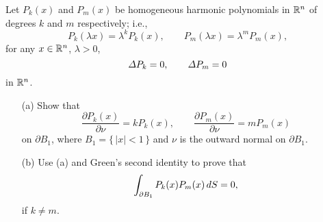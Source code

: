 \begin{problem}
  Let \(P_k(x)\) and \(P_m(x)\) be homogeneous harmonic polynomials in
  \(\mathbb{R}^n\) of degrees \(k\) and \(m\) respectively; i.e.,
  \[
    P_k(\lambda x)=\lambda^kP_k(x),\qquad P_m(\lambda x)=\lambda^mP_m(x),
  \]
  for any \(x\in\mathbb{R}^n\), \(\lambda>0\),
  \[
    \Lap P_k=0,\qquad\Lap P_m=0
  \]
  in \(\mathbb{R}^n\).
  \begin{itemize}[noitemsep]
  \item[(a)] Show that
    \[
      \frac{\partial P_k(x)}{\partial\nu}=kP_k(x),\qquad
      \frac{\partial P_m(x)}{\partial \nu}=mP_m(x)
    \]
    on \(\partial B_1\), where \(B_1=\{\,|x|<1\,\}\) and \(\nu\) is the
    outward normal on \(\partial B_1\).
  \item[(b)] Use (a) and Green's second identity to prove that
    \[
      \int_{\partial B_1} P_k(x)P_m(x)\mathop{}\!d S=0,
    \]
    if \(k\neq m\).
  \end{itemize}
\end{problem}
\begin{solution*}
\end{solution*}

